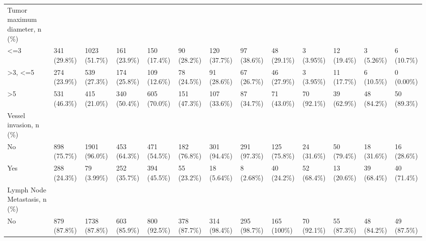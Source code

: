 \begin{landscape}
\begin{center}
\begin{longtable}{p{6.0cm}p{3.0cm}p{3.0cm}p{3.0cm}p{3.0cm}p{3.0cm}p{3.0cm}p{3.0cm}p{3.0cm}p{3.0cm}p{3.0cm}p{3.0cm}p{3.0cm}}
Tumor maximum diameter, n (\%) &                  &                  &                  &                  &                  &                  &                  &                  &                  &                  &                  &                  \\
    <=3 &   341 (29.8\%)    &   1023 (51.7\%)   &   161 (23.9\%)    &   150 (17.4\%)    &    90 (28.2\%)    &   120 (37.7\%)    &    97 (38.6\%)    &    48 (29.1\%)    &    3 (3.95\%)     &    12 (19.4\%)    &    3 (5.26\%)     &    6 (10.7\%)     \\
    >3, <=5 &   274 (23.9\%)    &   539 (27.3\%)    &   174 (25.8\%)    &   109 (12.6\%)    &    78 (24.5\%)    &    91 (28.6\%)    &    67 (26.7\%)    &    46 (27.9\%)    &    3 (3.95\%)     &    11 (17.7\%)    &    6 (10.5\%)     &    0 (0.00\%)     \\
    >5 &   531 (46.3\%)    &   415 (21.0\%)    &   340 (50.4\%)    &   605 (70.0\%)    &   151 (47.3\%)    &   107 (33.6\%)    &    87 (34.7\%)    &    71 (43.0\%)    &    70 (92.1\%)    &    39 (62.9\%)    &    48 (84.2\%)    &    50 (89.3\%)    \\
Vessel invasion, n (\%) &                  &                  &                  &                  &                  &                  &                  &                  &                  &                  &                  &                  \\
    No &   898 (75.7\%)    &   1901 (96.0\%)   &   453 (64.3\%)    &   471 (54.5\%)    &   182 (76.8\%)    &   301 (94.4\%)    &   291 (97.3\%)    &   125 (75.8\%)    &    24 (31.6\%)    &    50 (79.4\%)    &    18 (31.6\%)    &    16 (28.6\%)    \\
    Yes &   288 (24.3\%)    &    79 (3.99\%)    &   252 (35.7\%)    &   394 (45.5\%)    &    55 (23.2\%)    &    18 (5.64\%)    &    8 (2.68\%)     &    40 (24.2\%)    &    52 (68.4\%)    &    13 (20.6\%)    &    39 (68.4\%)    &    40 (71.4\%)    \\
Lymph Node Metastasis, n (\%) &                  &                  &                  &                  &                  &                  &                  &                  &                  &                  &                  &                  \\
    No &   879 (87.8\%)    &   1738 (87.8\%)   &   603 (85.9\%)    &   800 (92.5\%)    &   378 (87.7\%)    &   314 (98.4\%)    &   295 (98.7\%)    &    165 (100\%)    &    70 (92.1\%)    &    55 (87.3\%)    &    48 (84.2\%)    &    49 (87.5\%)    \\

\end{longtable}
\end{center}
\end{landscape}
